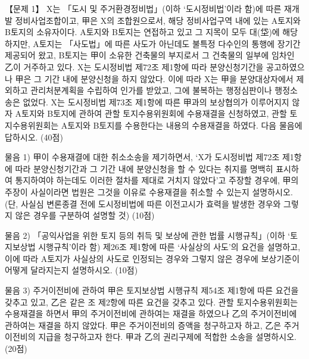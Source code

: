 \begin{longquestion}{【문제 1】}
X는 「도시 및 주거환경정비법」(이하 ‘도시정비법’이라 함)에 따른 재개발 정비사업조합이고, 甲은 X의 조합원으로서, 해당 정비사업구역 내에 있는 A토지와 B토지의 소유자이다. A토지와 B토지는 연접하고 있고 그 지목이 모두 대(垈)에 해당하지만, A토지는 「사도법」에 따른 사도가 아닌데도 불특정 다수인의 통행에 장기간 제공되어 왔고, B토지는 甲이 소유한 건축물의 부지로서 그 건축물의 일부에 임차인 乙이 거주하고 있다. X는 도시정비법 제72조 제1항에 따라 분양신청기간을 공고하였으나 甲은 그 기간 내에 분양신청을 하지 않았다. 이에 따라 X는 甲을 분양대상자에서 제외하고 관리처분계획을 수립하여 인가를 받았고, 그에 불복하는 행정심판이나 행정소송은 없었다. X는 도시정비법 제73조 제1항에 따른 甲과의 보상협의가 이루어지지 않자 A토지와 B토지에 관하여 관할 토지수용위원회에 수용재결을 신청하였고, 관할 토지수용위원회는 A토지와 B토지를 수용한다는 내용의 수용재결을 하였다. 다음 물음에 답하시오. (40점) \par
\medskip\noindent 물음 1) 甲이 수용재결에 대한 취소소송을 제기하면서, ‘X가 도시정비법 제72조 제1항에 따라 분양신청기간과 그 기간 내에 분양신청을 할 수 있다는 취지를 명백히 표시하여 통지하여야 하는데도 이러한 절차를 제대로 거치지 않았다’고 주장할 경우에, 甲의 주장이 사실이라면 법원은 그것을 이유로 수용재결을 취소할 수 있는지 설명하시오. (단, 사실심 변론종결 전에 도시정비법에 따른 이전고시가 효력을 발생한 경우와 그렇지 않은 경우를 구분하여 설명할 것) (10점) \par
\medskip\noindent 물음 2) 「공익사업을 위한 토지 등의 취득 및 보상에 관한 법률 시행규칙」(이하 ‘토지보상법 시행규칙’이라 함) 제26조 제1항에 따른 ‘사실상의 사도’의 요건을 설명하고, 이에 따라 A토지가 사실상의 사도로 인정되는 경우와 그렇지 않은 경우에 보상기준이 어떻게 달라지는지 설명하시오. (10점) \par
\medskip\noindent 물음 3) 주거이전비에 관하여 甲은 토지보상법 시행규칙 제54조 제1항에 따른 요건을 갖추고 있고, 乙은 같은 조 제2항에 따른 요건을 갖추고 있다. 관할 토지수용위원회는 수용재결을 하면서 甲의 주거이전비에 관하여는 재결을 하였으나 乙의 주거이전비에 관하여는 재결을 하지 않았다. 甲은 주거이전비의 증액을 청구하고자 하고, 乙은 주거이전비의 지급을 청구하고자 한다. 甲과 乙의 권리구제에 적합한 소송을 설명하시오. (20점) \par

\end{longquestion}
